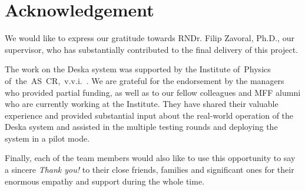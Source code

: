 \documentclass[deska]{subfiles}
\begin{document}
\chapter*{Acknowledgement}
\label{sec:acknowledgement}

We would like to express our gratitude towards RNDr. Filip Zavoral, Ph.D., our supervisor, who has substantially
contributed to the final delivery of this project.

The work on the Deska system was supported by the Institute of~Physics of~the~AS~CR,~v.v.i.~\cite{fzu}.  We are grateful
for the endorsement by the managers who provided partial funding, as well as to our fellow colleagues and MFF alumni who
are currently working at the Institute.  They have shared their valuable experience and provided substantial input about
the real-world operation of the Deska system and assisted in the multiple testing rounds and deploying the system in a
pilot mode.

Finally, each of the team members would also like to use this opportunity to say a sincere {\em Thank you!} to their
close friends, families and significant ones for their enormous empathy and support during the whole time.
\end{document}
